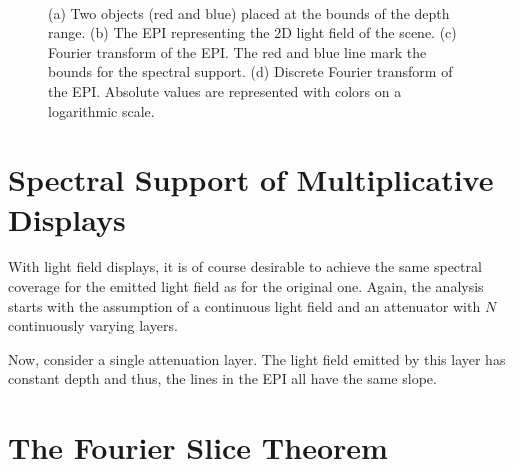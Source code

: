 \begin{figure}[htb]
	\subfigure[]{
		
		\label{fig:two_objects}
	}
	\hfill
	\subfigure[]{
		
		\label{fig:epi_two_objects}
	}
	\hfill
	\subfigure[]{
		
		\label{fig:epi_fourier_transform_1}
	} 
	\\
	\centering
	\caption[Spectral analysis for light fields with bounded depth range]
			{(a) Two objects (red and blue) placed at the bounds of the depth range. 
			 (b) The EPI representing the 2D light field of the scene.
			 (c) Fourier transform of the EPI. 
				 The red and blue line mark the bounds for the spectral support.
			 (d) Discrete Fourier transform of the EPI. 
				 Absolute values are represented with colors on a logarithmic scale.}
\end{figure}

\section{Spectral Support of Multiplicative Displays}
\label{sec:Spectral_Support_for_Display}

With light field displays, it is of course desirable to achieve the same spectral coverage for the emitted light field as for the original one.
Again, the analysis starts with the assumption of a continuous light field and an attenuator with $N$ continuously varying layers.

Now, consider a single attenuation layer. 
The light field emitted by this layer has constant depth and thus, the lines in the EPI all have the same slope.

\section{The Fourier Slice Theorem}


